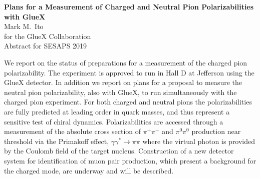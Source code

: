 \documentclass[letterpaper,12pt]{article}
\begin{document}
\begin{center}
{\large\bf
  Plans for a Measurement of Charged and Neutral Pion Polarizabilities
  with GlueX
} \\
\smallskip
Mark M.\ Ito \\
for the GlueX Collaboration \\
\smallskip
Abstract for SESAPS 2019
\end{center}

We report on the status of preparations for a measurement of the
charged pion polarizability. The experiment is approved to run in Hall
D at Jefferson using the GlueX detector. In addition we report on
plans for a proposal to measure the neutral pion polarizability, also
with GlueX, to run simultaneously with the charged pion experiment.
For both charged and neutral pions the polarizabilities are fully
predicted at leading order in quark masses, and thus represent a
sensitive test of chiral dynamics. Polarizabilities are accessed
through a measurement of the absolute cross section of $\pi^+\pi^-$
and $\pi^0\pi^0$ production near threshold via the Primakoff effect,
$\gamma \gamma^*\rightarrow \pi\pi$ where the virtual photon is
provided by the Coulomb field of the target nucleus. Construction of a
new detector system for identification of muon pair production, which
present a background for the charged mode, are underway and will be
described.
\end{document}
